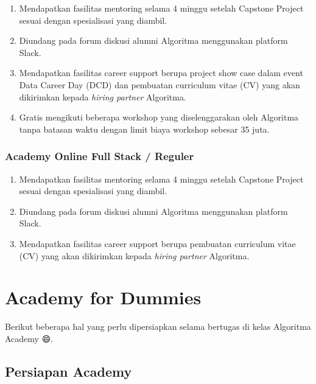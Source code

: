 \documentclass[
]{book}
\providecommand{\tightlist}{%
  \setlength{\itemsep}{0pt}\setlength{\parskip}{0pt}}
\begin{document}
\begin{enumerate}
\def\labelenumi{\arabic{enumi}.}
\tightlist
\item
  Mendapatkan fasilitas mentoring selama 4 minggu setelah Capstone Project sesuai dengan spesialisasi yang diambil.
\item
  Diundang pada forum diskusi alumni Algoritma menggunakan platform Slack.
\item
  Mendapatkan fasilitas career support berupa project show case dalam event Data Career Day (DCD) dan pembuatan curriculum vitae (CV) yang akan dikirimkan kepada \emph{hiring partner} Algoritma.
\item
  Gratis mengikuti beberapa workshop yang diselenggarakan oleh Algoritma tanpa batasan waktu dengan limit biaya workshop sebesar 35 juta.
\end{enumerate}

\hypertarget{academy-online-full-stack-reguler}{%
\subsection{Academy Online Full Stack / Reguler}\label{academy-online-full-stack-reguler}}

\begin{enumerate}
\def\labelenumi{\arabic{enumi}.}
\tightlist
\item
  Mendapatkan fasilitas mentoring selama 4 minggu setelah Capstone Project sesuai dengan spesialisasi yang diambil.
\item
  Diundang pada forum diskusi alumni Algoritma menggunakan platform Slack.
\item
  Mendapatkan fasilitas career support berupa pembuatan curriculum vitae (CV) yang akan dikirimkan kepada \emph{hiring partner} Algoritma.
\end{enumerate}

\hypertarget{academy-for-dummies}{%
\chapter{Academy for Dummies}\label{academy-for-dummies}}

Berikut beberapa hal yang perlu dipersiapkan selama bertugas di kelas Algoritma Academy 😄.

\hypertarget{persiapan-academy}{%
\section{Persiapan Academy}\label{persiapan-academy}}
\end{document}

